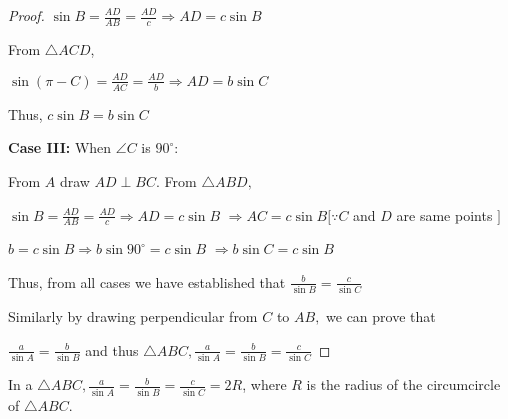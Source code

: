 \begin{proof}
  \noindent $\sin B = \frac{AD}{AB} = \frac{AD}{c}\Rightarrow AD = c\sin B$

  \noindent From $\triangle ACD$,

  \noindent $\sin(\pi - C) = \frac{AD}{AC} = \frac{AD}{b}\Rightarrow AD = b\sin C$

  \noindent Thus, $c\sin B = b\sin C$

  \textbf{Case III:} When $\angle C$ is $90^\circ$:
  \begin{center}
  \end{center}
  From $A$ draw $AD \perp BC.$ From $\triangle ABD,$

  \noindent $\sin B = \frac{AD}{AB} = \frac{AD}{c}\Rightarrow AD = c\sin B$ $\Rightarrow AC = c\sin B[\because C$ and $D$ are same points $]$

  \noindent$b = c\sin B \Rightarrow b\sin90^\circ = c\sin B$ $\Rightarrow b\sin C = c\sin B$

  \noindent Thus, from all cases we have established that $\frac{b}{\sin B} = \frac{c}{\sin C}$

  \noindent Similarly by drawing perpendicular from $C$ to $AB,$ we can prove that

  \noindent $\frac{a}{\sin A} = \frac{b}{\sin B}$ and thus $\triangle ABC, \frac{a}{\sin A} = \frac{b}{\sin B} = \frac{c}{\sin C}$
\end{proof}

\begin{theorem}
  In a $\triangle ABC, \frac{a}{\sin A} = \frac{b}{\sin B} = \frac{c}{\sin C} = 2R$, where $R$ is the radius of the circumcircle of
  $\triangle ABC$.
\end{theorem}

